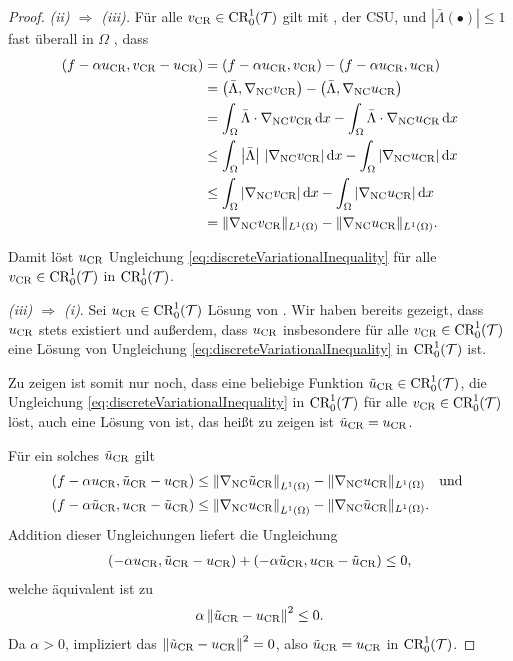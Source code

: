\begin{proof}
  \textit{(ii) $\Rightarrow$ (iii).}
  Für alle $v_\textup{CR}\in\textup{CR}^1_0(\mathcal{T})$ gilt mit
  , der CSU,
   und
  $\left|\bar\Lambda(\bullet)\right|\leq 1$ fast überall in $\Omega$ , dass
  \begin{align*}
    (f-\alpha u_\textup{CR},v_\textup{CR}-u_\textup{CR}) 
    &= 
    (f-\alpha u_\textup{CR},v_\textup{CR}) 
    - (f-\alpha u_\textup{CR},u_\textup{CR}) \\
    &=
    \left(\bar\Lambda,\nabla_\textup{NC}v_\textup{CR}\right)
    - \left(\bar\Lambda,\nabla_\textup{NC}u_\textup{CR}\right)\\
    &=
    \int_\Omega\bar\Lambda\cdot\nabla_\textup{NC}v_\textup{CR}\,\mathrm{d}x
    - \int_\Omega\bar\Lambda\cdot\nabla_\textup{NC}u_\textup{CR}\,\mathrm{d}x\\
    &\leq 
    \int_\Omega\left|\bar\Lambda\right|\,|\nabla_\textup{NC}v_\textup{CR}|\,\mathrm{d}x
    - \int_\Omega|\nabla_\textup{NC}u_\textup{CR}|\,\mathrm{d}x\\
    &\leq 
    \int_\Omega|\nabla_\textup{NC}v_\textup{CR}|\,\mathrm{d}x
    - \int_\Omega|\nabla_\textup{NC}u_\textup{CR}|\,\mathrm{d}x\\
    &=
    \Vert\nabla_\textup{NC}v_\textup{CR}\Vert_{L^1(\Omega)}
    -\Vert\nabla_\textup{NC}u_\textup{CR}\Vert_{L^1(\Omega)}.
  \end{align*}

  Damit löst $u_\textup{CR}$ Ungleichung \eqref{eq:discreteVariationalInequality}
  für alle $v_\textup{CR}\in\textup{CR}^1_0(\mathcal{T})$ in $\textup{CR}^1_0(\mathcal{T})$.

  \textit{(iii) $\Rightarrow$ (i)}.
  Sei $u_\textup{CR}\in\textup{CR}^1_0(\mathcal{T})$ Lösung von
  .
  Wir haben bereits gezeigt, dass $u_\textup{CR}$ stets existiert und außerdem, dass
  $u_\textup{CR}$ insbesondere für alle $v_\textup{CR}\in\textup{CR}^1_0(\mathcal{T})$ eine Lösung von
  Ungleichung \eqref{eq:discreteVariationalInequality} in $\textup{CR}^1_0(\mathcal{T})$ ist.

  Zu zeigen ist somit nur noch, dass eine beliebige Funktion
  $\tilde{u}_{\textup{CR}}\in\textup{CR}^1_0(\mathcal{T})$, die
  Ungleichung \eqref{eq:discreteVariationalInequality} in $\textup{CR}^1_0(\mathcal{T})$ für
  alle $v_\textup{CR}\in\textup{CR}^1_0(\mathcal{T})$ löst, auch eine Lösung von
   ist, das heißt zu zeigen ist
  $\tilde{u}_{\textup{CR}}=u_\textup{CR}$.

  Für ein solches $\tilde{u}_{\textup{CR}}$ gilt
  \begin{align*}
    \left(f-\alpha u_\textup{CR},\tilde{u}_{\textup{CR}}-u_\textup{CR}\right) 
    &\leq
    \left\Vert\nabla_\textup{NC}\tilde{u}_{\textup{CR}}\right\Vert_{L^1(\Omega)}
    -\Vert\nabla_\textup{NC}u_\textup{CR}\Vert_{L^1(\Omega)}\quad\text{und }\\
    \left(f-\alpha\tilde{u}_{\textup{CR}},u_\textup{CR}-\tilde{u}_{\textup{CR}}\right) 
    &\leq
    \left\Vert\nabla_\textup{NC}u_\textup{CR}\right\Vert_{L^1(\Omega)}
    -\Vert\nabla_\textup{NC}\tilde{u}_{\textup{CR}}\Vert_{L^1(\Omega)}. 
  \end{align*}
  Addition dieser Ungleichungen
  liefert die Ungleichung
  \begin{align*}
    \left(-\alpha u_\textup{CR},\tilde{u}_{\textup{CR}}-u_\textup{CR}\right) 
    + \left(-\alpha\tilde{u}_{\textup{CR}},u_\textup{CR}-\tilde{u}_{\textup{CR}}\right) 
    \leq
    0,
  \end{align*}
  welche äquivalent ist zu
  \begin{align*}
    \alpha\left\Vert\tilde{u}_{\textup{CR}}-u_\textup{CR}\right\Vert^2
    \leq
    0.
  \end{align*}
  Da $\alpha>0$, impliziert das
  $\left\Vert\tilde{u}_{\textup{CR}}-u_\textup{CR}\right\Vert^2=0$, also
  $\tilde{u}_{\textup{CR}}=u_\textup{CR}$ in $\textup{CR}^1_0(\mathcal{T})$.
\end{proof}


